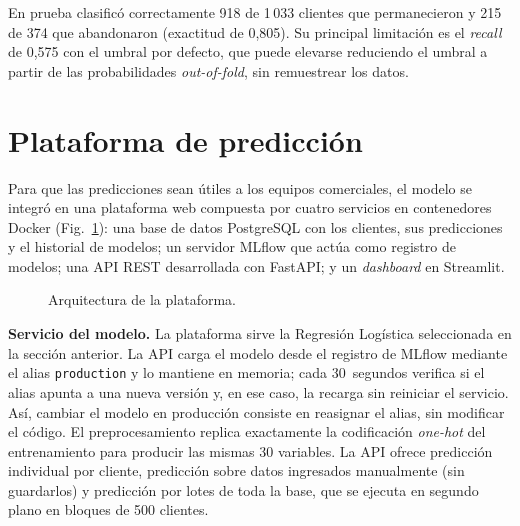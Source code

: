 \documentclass[conference]{IEEEtran}
\begin{document}
En prueba clasificó correctamente 918 de 1\,033 clientes que permanecieron y 215 de 374 que abandonaron (exactitud de 0,805). Su principal limitación es el \emph{recall} de 0,575 con el umbral por defecto, que puede elevarse reduciendo el umbral a partir de las probabilidades \emph{out-of-fold}, sin remuestrear los datos.

\section{Plataforma de predicción}\label{sec:plataforma}

Para que las predicciones sean útiles a los equipos comerciales, el modelo se integró en una plataforma web compuesta por cuatro servicios en contenedores Docker (Fig.~\ref{fig:arq}): una base de datos PostgreSQL con los clientes, sus predicciones y el historial de modelos; un servidor MLflow que actúa como registro de modelos; una API REST desarrollada con FastAPI; y un \emph{dashboard} en Streamlit.

\begin{figure}[!t]
\centering
{}
\caption{Arquitectura de la plataforma.}
\label{fig:arq}
\end{figure}

\textbf{Servicio del modelo.} La plataforma sirve la Regresión Logística seleccionada en la sección anterior. La API carga el modelo desde el registro de MLflow mediante el alias \texttt{production} y lo mantiene en memoria; cada 30~segundos verifica si el alias apunta a una nueva versión y, en ese caso, la recarga sin reiniciar el servicio. Así, cambiar el modelo en producción consiste en reasignar el alias, sin modificar el código. El preprocesamiento replica exactamente la codificación \emph{one-hot} del entrenamiento para producir las mismas 30 variables. La API ofrece predicción individual por cliente, predicción sobre datos ingresados manualmente (sin guardarlos) y predicción por lotes de toda la base, que se ejecuta en segundo plano en bloques de 500 clientes.
\end{document}
